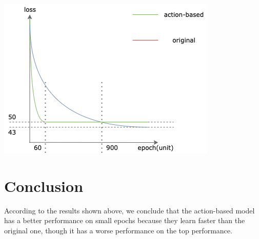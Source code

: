 \documentclass[10pt,twocolumn,letterpaper]{article}
\begin{document}
\includegraphics[scale=0.55]{training_epochs.png}



\section{Conclusion}
According to the results shown above, we conclude that the action-based model has a better performance on small epochs because 
they learn faster than the original one, though it has a worse performance on the top performance.


\newpage

{\small


}
\end{document}
